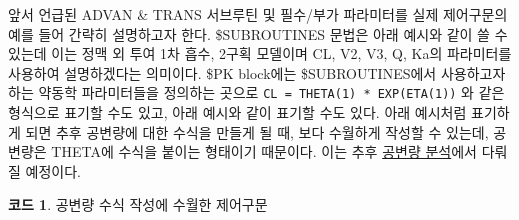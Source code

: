 \documentclass[
  10pt,
  krantz2,
  a4paper]{krantz}
\newenvironment{Shaded}{\begin{snugshade}}{\end{snugshade}}
\newcommand{\DecValTok}[1]{\textcolor[rgb]{0.00,0.00,0.81}{#1}}
\newcommand{\KeywordTok}[1]{\textcolor[rgb]{0.13,0.29,0.53}{\textbf{#1}}}
\newcommand{\NormalTok}[1]{#1}
\newcommand{\OperatorTok}[1]{\textcolor[rgb]{0.81,0.36,0.00}{\textbf{#1}}}
\newcommand{\StringTok}[1]{\textcolor[rgb]{0.31,0.60,0.02}{#1}}
\theoremstyle{definition}
\theoremstyle{definition}
\newtheorem{example}{코드}[chapter]
\theoremstyle{definition}
\theoremstyle{remark}
\begin{document}
앞서 언급된 ADVAN \& TRANS 서브루틴 및 필수/부가 파라미터를 실제 제어구문의 예를 들어 간략히 설명하고자 한다. \$SUBROUTINES 문법은 아래 예시와 같이 쓸 수 있는데 이는 정맥 외 투여 1차 흡수, 2구획 모델이며 CL, V2, V3, Q, Ka의 파라미터를 사용하여 설명하겠다는 의미이다. \$PK block에는 \$SUBROUTINES에서 사용하고자 하는 약동학 파라미터들을 정의하는 곳으로 \texttt{CL\ =\ THETA(1)\ *\ EXP(ETA(1))} 와 같은 형식으로 표기할 수도 있고, 아래 예시와 같이 표기할 수도 있다. 아래 예시처럼 표기하게 되면 추후 공변량에 대한 수식을 만들게 될 때, 보다 수월하게 작성할 수 있는데, 공변량은 THETA에 수식을 붙이는 형태이기 때문이다. 이는 추후 \protect\hyperlink{covariate-analysis}{공변량 분석}에서 다뤄질 예정이다.

\begin{example}
\protect\hypertarget{exm:code-example-advan4}{}{\label{exm:code-example-advan4} }공변량 수식 작성에 수월한 제어구문
\end{example}

\begin{Shaded}
\end{Shaded}
\end{document}
